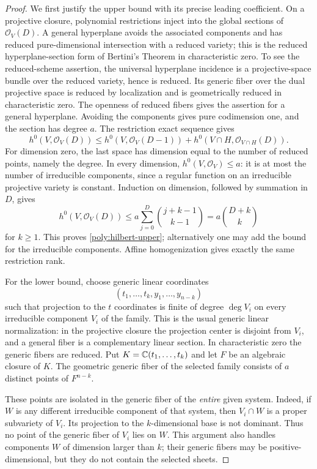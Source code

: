 \begin{proof}
We first justify the upper bound with its precise leading coefficient.
On a projective closure, polynomial restrictions inject into the global
sections of $\mathcal O_V(D)$.  A general hyperplane avoids the
associated components and has reduced pure-dimensional intersection
with a reduced variety; this is the reduced hyperplane-section form of
Bertini's Theorem in characteristic zero.  To see the reduced-scheme
assertion, the universal hyperplane incidence is a projective-space
bundle over the reduced variety, hence is reduced.  Its generic fiber
over the dual projective space is reduced by localization and is
geometrically reduced in characteristic zero.  The openness of reduced
fibers \cite[Tag~0578]{stacksproject} gives the assertion for a general
hyperplane.  Avoiding the components gives pure codimension one, and
the section has degree $a$.  The restriction exact sequence gives
\[
 h^0(V,\mathcal O_V(D))\le
 h^0(V,\mathcal O_V(D-1))+
 h^0(V\cap H,\mathcal O_{V\cap H}(D)).
\]
For dimension zero, the last space has dimension equal to the number
of reduced points, namely the degree.  In every dimension,
$h^0(V,\mathcal O_V)\le a$: it is at most the number of irreducible
components, since a regular function on an irreducible projective
variety is constant.  Induction on dimension, followed by summation in
$D$, gives
\[
 h^0(V,\mathcal O_V(D))
 \le a\sum_{j=0}^D\binom{j+k-1}{k-1}
 =a\binom{D+k}{k}
\]
for $k\ge1$.  This proves \eqref{poly:hilbert-upper}; alternatively one
may add the bound for the irreducible components.  Affine
homogenization gives exactly the same restriction rank.

For the lower bound, choose generic linear coordinates
\[
 (t_1,\ldots,t_k,y_1,\ldots,y_{n-k})
\]
such that projection to the $t$ coordinates is finite of degree
$\deg V_i$ on every irreducible component $V_i$ of the family.  This is
the usual generic linear normalization: in the projective closure the
projection center is disjoint from $V_i$, and a general fiber is a
complementary linear section.  In characteristic zero the generic
fibers are reduced.  Put $K=\mathbb C(t_1,\ldots,t_k)$ and let $F$ be an
algebraic closure of $K$.  The geometric generic fiber of the selected
family consists of $a$ distinct points of $F^{n-k}$.

These points are isolated in the generic fiber of the \emph{entire}
given system.  Indeed, if $W$ is any different irreducible component
of that system, then $V_i\cap W$ is a proper subvariety of $V_i$.
Its projection to the $k$-dimensional base is not dominant.  Thus no
point of the generic fiber of $V_i$ lies on $W$.  This argument also
handles components $W$ of dimension larger than $k$; their generic
fibers may be positive-dimensional, but they do not contain the
selected sheets.


\end{proof}
